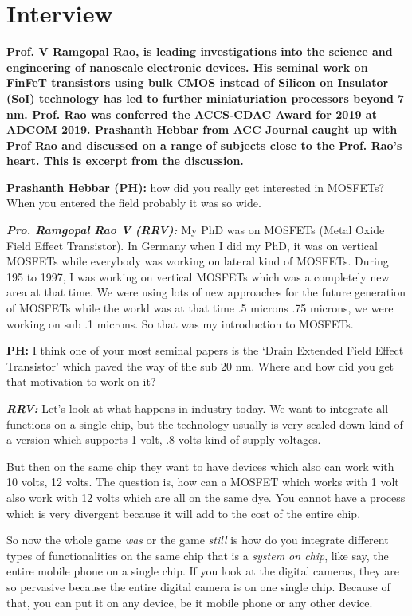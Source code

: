 \chapter{Interview}


\textbf{Prof. V Ramgopal Rao, is leading investigations into the science and engineering of nanoscale electronic devices. His seminal work on FinFeT transistors using bulk  CMOS instead of Silicon on Insulator (SoI) technology has led to further miniaturiation processors beyond 7 nm. Prof. Rao was conferred the ACCS-CDAC Award for 2019 at ADCOM 2019. Prashanth Hebbar from ACC Journal caught up with Prof Rao and discussed on a range of subjects close to the Prof. Rao’s heart. This is excerpt from the discussion.}

\textbf{Prashanth Hebbar (PH):} how did you really get interested in MOSFETs? When you entered the field probably it was so wide.

\textbf{\textit {Pro. Ramgopal Rao V (RRV):}} My PhD was on MOSFETs (Metal Oxide Field Effect Transistor). In Germany when I did my PhD, it was on vertical MOSFETs while everybody was working on lateral kind of MOSFETs. During 195 to 1997, I was working on vertical MOSFETs which was a completely new area at that time. We were using lots of new approaches for the future generation of MOSFETs while the world was at that time .5 microns .75 microns, we were working on sub .1 microns. So that was my introduction to MOSFETs.

\textbf{PH:}  I think one of your most seminal papers is the ‘Drain Extended Field Effect Transistor’ which paved the way of the sub 20 nm. Where and how did you get that motivation to work on it?

\textbf{\textit {RRV:}} Let’s look at what happens in industry today. We want to integrate all functions on a single chip, but the technology usually is very scaled down kind of a version which supports 1 volt, .8 volts kind of supply voltages.

But then on the same chip they want to have devices which also can work with 10 volts, 12 volts. The question is, how can a MOSFET which works with 1 volt also work with 12 volts which are all on the same dye. You cannot have a process which is very divergent because it will add to the cost of the entire chip.

So now the whole game \textit{was} or the game \textit{still} is how do you integrate different types of functionalities on the same chip that is a \textit{system on chip}, like say, the entire mobile phone on a single chip. If you look at the digital cameras, they are so pervasive because the entire digital camera is on one single chip. Because of that, you can put it on any device, be it mobile phone or any other device.

